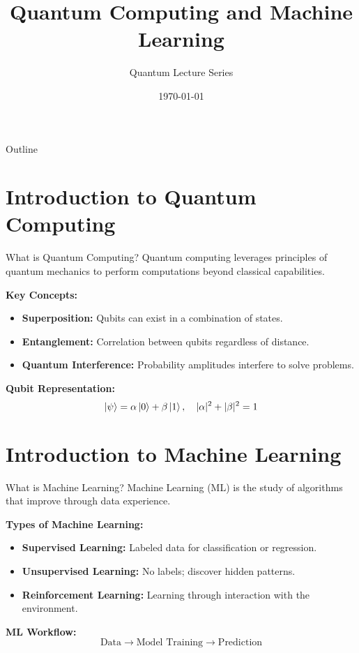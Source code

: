 \documentclass{beamer}
\title[Quantum Computing and ML]{\textbf{Quantum Computing and Machine Learning}}
\author{Quantum Lecture Series}
\institute{Department of Quantum Information Science}
\date{\today}
\begin{document}
\begin{frame}
    \titlepage
\end{frame}

\begin{frame}{Outline}
\tableofcontents
\end{frame}

\section{Introduction to Quantum Computing}
\begin{frame}{What is Quantum Computing?}
Quantum computing leverages principles of quantum mechanics to perform computations beyond classical capabilities.

\vspace{10pt}
\textbf{Key Concepts:}
\begin{itemize}
    \item \textbf{Superposition:} Qubits can exist in a combination of states.
    \item \textbf{Entanglement:} Correlation between qubits regardless of distance.
    \item \textbf{Quantum Interference:} Probability amplitudes interfere to solve problems.
\end{itemize}

\pause
\textbf{Qubit Representation:}
\[
\ket{\psi} = \alpha \ket{0} + \beta \ket{1}, \quad |\alpha|^2 + |\beta|^2 = 1
\]
\end{frame}

\section{Introduction to Machine Learning}
\begin{frame}{What is Machine Learning?}
Machine Learning (ML) is the study of algorithms that improve through data experience.

\textbf{Types of Machine Learning:}
\begin{itemize}
    \item \textbf{Supervised Learning:} Labeled data for classification or regression.
    \item \textbf{Unsupervised Learning:} No labels; discover hidden patterns.
    \item \textbf{Reinforcement Learning:} Learning through interaction with the environment.
\end{itemize}

\pause
\textbf{ML Workflow:}
\[
\text{Data} \rightarrow \text{Model Training} \rightarrow \text{Prediction}
\]
\end{frame}
\end{document}
